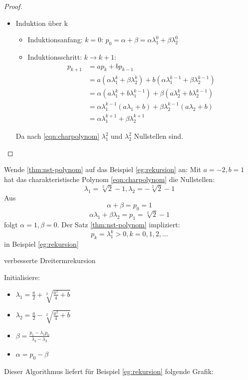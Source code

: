 \begin{proof}
\begin{itemize}
	\item Induktion über k\medskip
\begin{itemize}[label=$\lozenge$, itemsep=2ex]
\item Induktionsanfang: \underline{$k=0$}: 
	$p_0=\alpha+\beta = \alpha \lambda_1^{0}+\beta \lambda_2^{0}$
\item Induktionsschritt: \underline{$k \to k+1$}:
	\begin{align*}
	p_{k+1}
	&=ap_k +bp_{k-1} \\
	&= a(\alpha \lambda_1^{k}+ \beta \lambda_2^{k}) + b(\alpha \lambda_1^{k-1}+\beta \lambda_2^{k-1}) \\
	&= \alpha (a \lambda_1^{k}+ b\lambda_1^{k-1})+ \beta (a \lambda_2^{k}+ b \lambda_2^{k-1}) \\
	&= \alpha \lambda_1^{k-1}(a\lambda_1+b) + \beta \lambda_2^{k-1}(a\lambda_2 +b)\\
	&= \alpha \lambda_1^{k+1} + \beta \lambda_2^{k+1}
	\end{align*}
\end{itemize}
Da nach \eqref{eqn:charpolynom} $\lambda_1^2$ und $\lambda_2^2$ Nullstellen sind.
\end{itemize}
\end{proof}
Wende \ref{thm:nst-polynom} auf das Beispiel \ref{eg:rekursion} an: Mit $a=-2, b=1$ hat das charakteristische Polynom \eqref{eqn:charpolynom} die Nullstellen:
\[
\lambda_1= \sqrt[2]{2}-1, \lambda_2= -\sqrt[2]{2}-1 
\]
Aus
\[
\alpha + \beta =p_0 =1
\]
\[
\alpha \lambda_1 + \beta \lambda_2= p_1 = \sqrt[2]{2}-1
\]
folgt $\alpha = 1, \beta = 0$. Der Satz \ref{thm:nst-polynom} impliziert:
\[
p_k= \lambda_1^{k}> 0, k=0,1,2,\ldots
\]
in Beispiel \ref{eg:rekursion}\\
\begin{algorithm}[H]
\label{alg:rekursion}
 \caption{verbesserte Dreitermrekursion}
Initialisiere:
\begin{itemize}
	\item $\lambda_1 = \frac{a}{2}+\sqrt[2]{\frac{a^2}{4}+b}$
	\item $\lambda_2= \frac{a}{2}-\sqrt[2]{\frac{a^2}{4}+b}$
	\item $\beta= \frac{p_1-\lambda_1p_0}{\lambda_2-\lambda_2}$
	\item $\alpha = p_0-\beta$
\end{itemize}
\end{algorithm}
Dieser Algorithmus liefert für Beispiel \ref{eg:rekursion} folgende Grafik:

